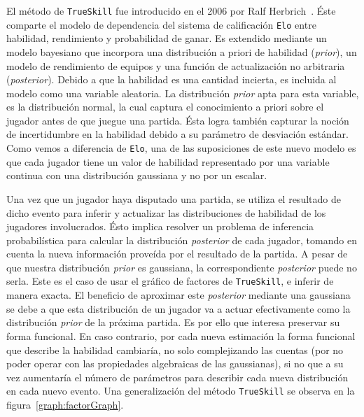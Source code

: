 \documentclass[11pt,twoside,spanish]{report} %
\begin{document}
El m\'etodo de  \texttt{TrueSkill}  fue introducido en el 2006 por Ralf Herbrich~\cite{Herbrich2007}.
\'Este comparte el modelo de dependencia del sistema de calificaci\'on \texttt{Elo} entre habilidad, rendimiento y probabilidad de ganar.
Es extendido mediante un modelo bayesiano que incorpora una distribuci\'on a priori de habilidad (\textit{prior}), un modelo de rendimiento de equipos y una funci\'on de actualizaci\'on no arbitraria (\textit{posterior}).
Debido a que la habilidad es una cantidad incierta,  es incluida al modelo como una variable aleatoria.
La distribuci\'on  \textit{prior} apta para esta variable, es la distribuci\'on normal, la cual captura el conocimiento a priori sobre el jugador antes de que juegue una partida.
\'Esta logra tambi\'en capturar la noci\'on de incertidumbre en la habilidad debido a su par\'ametro de desviaci\'on est\'andar.
Como vemos a diferencia de \texttt{Elo}, una de las suposiciones de este nuevo modelo es que cada jugador tiene un valor de habilidad representado por una variable continua con una distribuci\'on gaussiana y no por un escalar.

Una vez que un jugador haya disputado una partida, se utiliza el resultado de dicho evento para inferir y actualizar las distribuciones de habilidad de los jugadores involucrados.
\'Esto implica resolver un problema de inferencia probabil\'istica para calcular la distribuci\'on \textit{posterior}  de cada jugador,  tomando en cuenta la nueva informaci\'on prove\'ida por el resultado de la partida.
A pesar de que nuestra distribuci\'on \textit{prior} es gaussiana, la correspondiente \textit{posterior} puede no serla.
Este es el caso de usar el gr\'afico de factores de \texttt{TrueSkill}, e inferir de manera exacta.
El beneficio de aproximar este \textit{posterior} mediante una gaussiana se debe a que esta distribuci\'on de un jugador va a actuar efectivamente como la distribuci\'on \textit{prior} de la pr\'oxima partida.
Es por ello que interesa preservar su forma funcional.
En caso contrario, por cada nueva estimaci\'on la forma funcional que describe la habilidad cambiar\'ia, no solo complejizando las cuentas (por no poder operar con las propiedades algebraicas de las gaussianas), si no que a su vez aumentar\'ia el n\'umero de par\'ametros para describir cada nueva distribuci\'on en cada nuevo evento.
Una generalizaci\'on del  m\'etodo  \texttt{TrueSkill} se observa en la figura~\ref{graph:factorGraph}.
\end{document}
